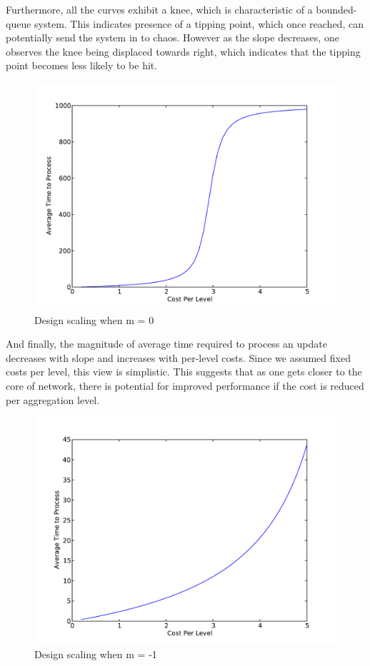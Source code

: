 \documentclass[conference]{IEEEtran}
\begin{document}
 
 Furthermore, all the curves exhibit a knee, which is characteristic of a bounded-queue system. This indicates presence of a tipping point, which once reached, can potentially send the system in to chaos. However as the slope decreases, one observes the knee being displaced towards right, which indicates that the tipping point becomes less likely to be hit.
 
 \begin{figure}[h]
 \centering
 \includegraphics[scale=0.50]{incident_isss_zero_slope}
 \caption{Design scaling when m = 0}
 \label{fig:incident_isss_zero_slope}
 \end{figure}

 And finally, the magnitude of average time required to process an update decreases with slope and increases with per-level costs. Since we assumed fixed costs per level, this view is simplistic. This suggests that as one gets closer to the core of network, there is potential for improved performance if the cost is reduced per aggregation level.

 \begin{figure}[h]
 \centering
 \includegraphics[scale=0.50]{incident_isss_negative_slope}
 \caption{Design scaling when m = -1}
 \label{fig:incident_isss_negative_slope}
 \end{figure}
\end{document}
